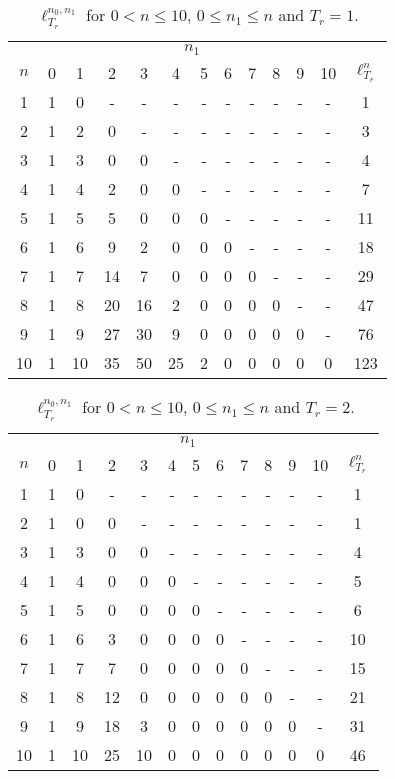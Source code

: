 \documentclass{article}
\begin{document}
  \clearpage


  \begin{table}[!ht]
    \centering
    \begin{tabular}{*{13}{c}}
      \toprule
      & \multicolumn{11}{c}{$n_1$} & \\
      $n$ & 0 & 1 & 2 & 3 & 4 & 5 & 6 & 7 & 8 & 9 & 10 & $\ell_{T_r}^{n}$ \\
      \midrule
      1 & 1 & 0 & - & - & - & - & - & - & - & - & - & 1 \\
      2 & 1 & 2 & 0 & - & - & - & - & - & - & - & - & 3 \\
      3 & 1 & 3 & 0 & 0 & - & - & - & - & - & - & - & 4 \\
      4 & 1 & 4 & 2 & 0 & 0 & - & - & - & - & - & - & 7 \\
      5 & 1 & 5 & 5 & 0 & 0 & 0 & - & - & - & - & - & 11 \\
      6 & 1 & 6 & 9 & 2 & 0 & 0 & 0 & - & - & - & - & 18 \\
      7 & 1 & 7 & 14 & 7 & 0 & 0 & 0 & 0 & - & - & - & 29 \\
      8 & 1 & 8 & 20 & 16 & 2 & 0 & 0 & 0 & 0 & - & - & 47 \\
      9 & 1 & 9 & 27 & 30 & 9 & 0 & 0 & 0 & 0 & 0 & - & 76 \\
      10 & 1 & 10 & 35 & 50 & 25 & 2 & 0 & 0 & 0 & 0 & 0 & 123 \\
      \bottomrule
    \end{tabular}
    \caption{$\ell_{T_r}^{n_0,n_1}$ for $0 < n \leq 10$, $0 \leq n_1 \leq n$ and $T_r = 1$.}
  \end{table}

  \begin{table}[!ht]
    \centering
    \begin{tabular}{*{13}{c}}
      \toprule
      & \multicolumn{11}{c}{$n_1$} & \\
      $n$ & 0 & 1 & 2 & 3 & 4 & 5 & 6 & 7 & 8 & 9 & 10 & $\ell_{T_r}^{n}$ \\
      \midrule
      1 & 1 & 0 & - & - & - & - & - & - & - & - & - & 1 \\
      2 & 1 & 0 & 0 & - & - & - & - & - & - & - & - & 1 \\
      3 & 1 & 3 & 0 & 0 & - & - & - & - & - & - & - & 4 \\
      4 & 1 & 4 & 0 & 0 & 0 & - & - & - & - & - & - & 5 \\
      5 & 1 & 5 & 0 & 0 & 0 & 0 & - & - & - & - & - & 6 \\
      6 & 1 & 6 & 3 & 0 & 0 & 0 & 0 & - & - & - & - & 10 \\
      7 & 1 & 7 & 7 & 0 & 0 & 0 & 0 & 0 & - & - & - & 15 \\
      8 & 1 & 8 & 12 & 0 & 0 & 0 & 0 & 0 & 0 & - & - & 21 \\
      9 & 1 & 9 & 18 & 3 & 0 & 0 & 0 & 0 & 0 & 0 & - & 31 \\
      10 & 1 & 10 & 25 & 10 & 0 & 0 & 0 & 0 & 0 & 0 & 0 & 46 \\
      \bottomrule
    \end{tabular}
    \caption{$\ell_{T_r}^{n_0,n_1}$ for $0 < n \leq 10$, $0 \leq n_1 \leq n$ and $T_r = 2$.}
  \end{table}
\end{document}
